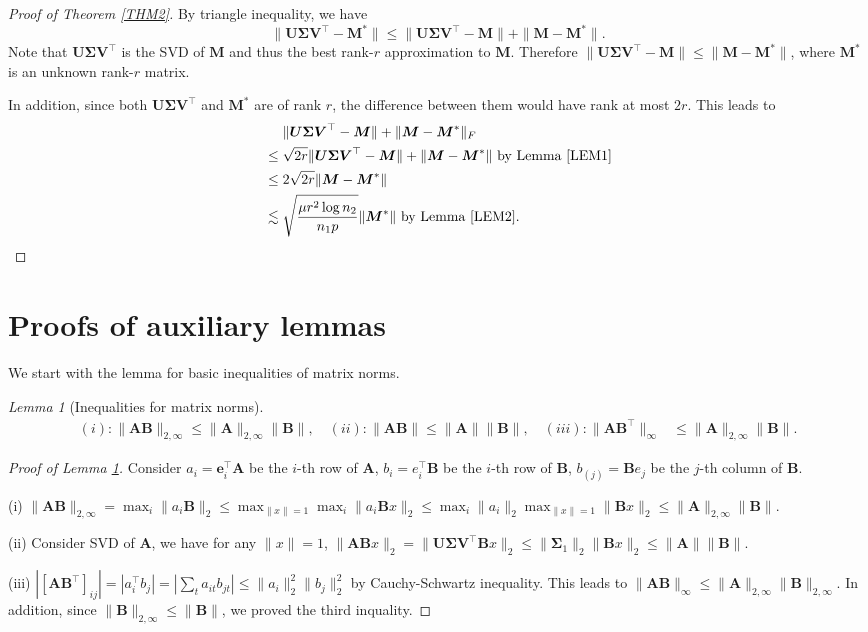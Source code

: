 \documentclass[12pt]{article}
\theoremstyle{remark}
\newcommand{\bs}[1]{{\boldsymbol{#1}^*}}
\newcommand{\bb}[1]{{\boldsymbol {#1}}}
\newtheorem{lemma}{Lemma}
\begin{document}
\begin{proof}[Proof of Theorem \ref{THM2}]
By triangle inequality, we have
\[
\|\bb U\bb \Sigma \bb V^\top - \bs M\|
\leq
\|\bb U\bb \Sigma \bb V^\top - \bb M\| +\|\bb M - \bs M\|.
\]
Note that $\bb U\bb \Sigma \bb V^\top$ is the SVD of $\bb M$ and thus the best rank-$r$ approximation to $\bb M$. 
Therefore $\|\bb U\bb \Sigma \bb V^\top - \bb M\| \leq \|\bb M - \bs M\|$, where $\bs M$ is an unknown rank-$r$ matrix.

In addition, since both $\bb U\bb \Sigma \bb V^\top $ and $\bs M$ are of rank $r$, the difference between them would have rank at most $2r$. This leads to 
\begin{align*}
    &~~~~  \|\bb U\bb \Sigma \bb V^\top - \bb M\| +\|\bb M - \bs M\|_F\\
     & \leq \sqrt{2r} \|\bb U\bb \Sigma \bb V^\top - \bb M\| +\|\bb M - \bs M\| \text{ by Lemma \ref{LEM1}}\\
     & \leq 2\sqrt{2r} \|\bb M - \bs M\|\\
     & \lesssim \sqrt{\frac{\mu r^2 \log n_2}{n_1 p }} \|\bs M\| \text{ by Lemma \ref{LEM2}}.
\end{align*}
\end{proof}


\section{Proofs of auxiliary lemmas}

We start with the lemma for basic inequalities of matrix norms.

\begin{lemma}[Inequalities for matrix norms]
\label{LEM3}
\begin{align*}
(i): \|\bb A\bb B\|_{2,\infty} \leq \|\bb A\|_{2,\infty} \|\bb B\|, \quad 
(ii): \|\bb A\bb B\| \leq \|\bb A\|\|\bb B\|,\quad
(iii): \|\bb A\bb B^\top \|_{\infty} & \leq \|\bb A\|_{2,\infty} \|\bb B\|.
\end{align*}
\end{lemma}
\begin{proof}[Proof of Lemma \ref{LEM3}]
Consider $a_i = \bb e_i^\top\bb A $ be the $i$-th row of $\bb A$, $b_i = e_i^\top \bb B$ be the $i$-th row of $\bb B$, $b_{(j)}  = \bb B e_j$ be the $j$-th column of $\bb B$.

(i) $\|\bb A\bb B\|_{2,\infty}  =  \max_{i} \|a_i \bb B\|_2 
\leq  \max_{\|x\| = 1}\max_{i} \|a_i \bb B x\|_2 
\leq  \max_{i}  \|a_{i}\|_2 \max_{\|x\| = 1} \|\bb Bx\|_2
\leq \|\bb A\|_{2,\infty} \|\bb B\|$.

(ii) Consider SVD of $\bb A$, we have for any $\|x\| =1$, 
$\|\bb A\bb B x\|_2 = \|\bb U\bb\Sigma\bb V^\top \bb B x\|_2 \leq \|\bb\Sigma_1\|_2 \|\bb B x\|_2 \leq \|\bb A\|\|\bb B\|$.

(iii) $|[\bb A\bb B^\top]_{ij}| =|a_i^\top b_j| = |\sum_{t} a_{it} b_{jt}| \leq \|a_i\|_2^2 \|b_j\|_2^2$ by Cauchy-Schwartz inequality. 
This leads to $\|\bb A\bb B\|_{\infty} \leq \|\bb A\|_{2,\infty}\|\bb B\|_{2,\infty}$.
In addition, since $\|\bb B\|_{2,\infty} \leq \|\bb B\|$, we proved the third inquality. 
\end{proof}
\end{document}
